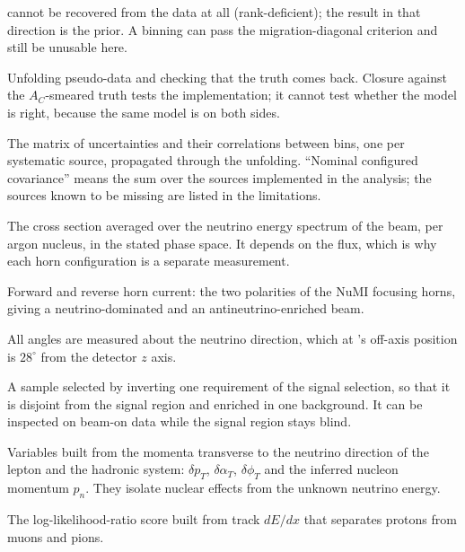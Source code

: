 \begin{description}
    cannot be recovered from the data at all (rank-deficient); the result in that direction is the
    prior. A binning can pass the migration-diagonal criterion and still be unusable here.
  \item[Closure] Unfolding pseudo-data and checking that the truth comes back. Closure against the
    $A_C$-smeared truth tests the implementation; it cannot test whether the model is right,
    because the same model is on both sides.
  \item[Covariance] The matrix of uncertainties and their correlations between bins, one per
    systematic source, propagated through the unfolding. ``Nominal configured covariance'' means the
    sum over the sources implemented in the analysis; the sources known to be missing are listed
    in the limitations.
  \item[Flux-averaged cross section] The cross section averaged over the neutrino energy spectrum
    of the beam, per argon nucleus, in the stated phase space. It depends on the flux, which is why
    each horn configuration is a separate measurement.
  \item[FHC, RHC] Forward and reverse horn current: the two polarities of the NuMI focusing horns,
    giving a neutrino-dominated and an antineutrino-enriched beam.
  \item[Beam frame] All angles are measured about the neutrino direction, which at \uboone{}'s
    off-axis position is $28^\circ$ from the detector $z$ axis.
  \item[Control region, sideband] A sample selected by inverting one requirement of the signal
    selection, so that it is disjoint from the signal region and enriched in one background. It
    can be inspected on beam-on data while the signal region stays blind.
  \item[Transverse kinematic imbalance (TKI)] Variables built from the momenta transverse to the
    neutrino direction of the lepton and the hadronic system: $\delta p_T$, $\delta\alpha_T$,
    $\delta\phi_T$ and the inferred nucleon momentum $p_n$. They isolate nuclear effects from the
    unknown neutrino energy.
  \item[LLR particle identification] The log-likelihood-ratio score built from track $dE/dx$ that
    separates protons from muons and pions.
  \end{description}
